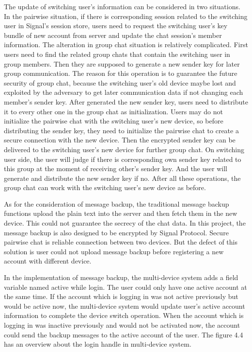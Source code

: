 \begin{enumerate}[label=(\roman*)]
The update of switching user's information can be considered in two situations. In the pairwise situation, if there is corresponding session related to the switching user in Signal's session store, users need to request the switching user's key bundle of new account from server and update the chat session's member information. The alteration in group chat situation is relatively complicated. First users need to find the related group chats that contain the switching user in group members. Then they are supposed to generate a new sender key for later group communication. The reason for this operation is to guarantee the future security of group chat, because the switching user's old device maybe lost and exploited by the adversary to get later communication data if not changing each member's sender key. After generated the new sender key, users need to distribute it to every other one in the group chat as initialization. Users may do not initialize the pairwise chat with the switching user's new device, so before distributing the sender key, they need to initialize the pairwise chat to create a secure connection with the new device. Then the encrypted sender key can be delivered to the switching user's new device for further group chat. On switching user side, the user will judge if there is corresponding own sender key related to this group at the moment of receiving other's sender key. And the user will generate and distribute the new sender key if no. After all these operations, the group chat can work with the switching user's new device as before.

As for the consideration of message backup, the traditional message backup functions upload the plain text into the server and then fetch them in the new device. This could not guarantee the secrecy of the chat data. In this project, the message backup is also designed to be encrypted by Signal Protocol. Secure pairwise chat is reliable connection between two devices. But the defect of this solution is user could not upload message backup before registering a new account with different device.

In the implementation of message backup, the multi-device system adds a field variable named active while login. The user could only have one active account at the same time. If the account which is logging in was not active previously but would be active now, the multi-device system would update user's active account information to complete the device switch operation. When the account which is logging in was inactive previously and would not be activated now, the account could send the backup messages to the active account of the user. The figure 4.4 has an overview about the login handle in multi-device system.


\end{enumerate}
